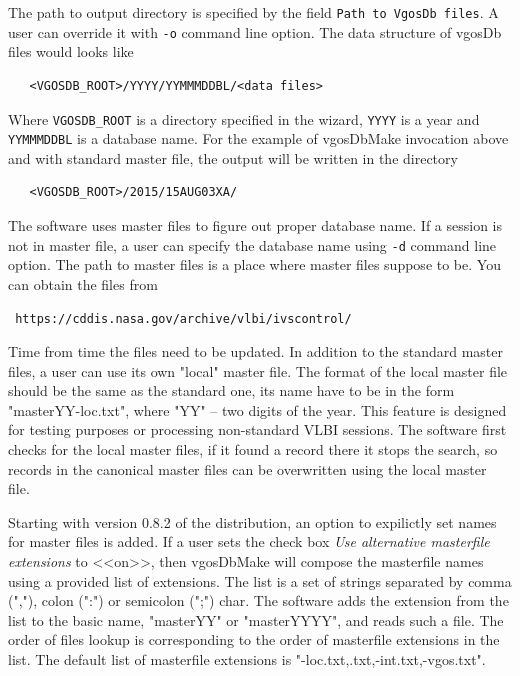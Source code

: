 \documentclass [10pt,letterpaper]{report}
\begin{document}
The path to output directory is specified by the field {\tt Path to VgosDb files}.
A user can override it with {\tt -o} command line option. The data structure of
vgosDb files would looks like
\begin{verbatim}
   <VGOSDB_ROOT>/YYYY/YYMMMDDBL/<data files>
\end{verbatim}
Where {\tt VGOSDB\_ROOT} is a directory specified in the wizard, {\tt YYYY} is
a year and {\tt YYMMMDDBL} is a database name. For the example of vgosDbMake
invocation above and with standard master file, the output will be written
in the directory
\begin{verbatim}
   <VGOSDB_ROOT>/2015/15AUG03XA/
\end{verbatim}

The software uses master files to figure out proper database name. If a
session is not in master file, a user can specify the database name using
{\tt -d} command line option. The path to master files is a place where
master files suppose to be. You can obtain the files from
\begin{center}
{\tt
https://cddis.nasa.gov/archive/vlbi/ivscontrol/
}
\end{center}
\noindent
Time from time the files need to be updated. In addition to the standard master
files, a user can use its own "local" master file. The format of the local master
file should be the same as the standard one, its name have to be in the form
"masterYY-loc.txt", where "YY" -- two digits of the year. This feature is designed
for testing purposes or processing non-standard VLBI sessions. The software first
checks for the local master files, if it found a record there it stops the search,
so records in the canonical master files can be overwritten using the local
master file.

Starting with version 0.8.2 of the distribution, an option to expilictly set names
for master files is added. If a user sets the check box {\sl Use alternative
masterfile extensions} to <<on>>, then vgosDbMake will compose the masterfile names
using a provided list of extensions. The list is a set of strings separated by
comma (","), colon (":") or semicolon (";") char. The software adds the extension
from the list to the basic name, "masterYY" or "masterYYYY", and reads such a file.
The order of files lookup is corresponding to the order of masterfile
extensions in the list. The default list of masterfile extensions is
"-loc.txt,.txt,-int.txt,-vgos.txt".
\end{document}
